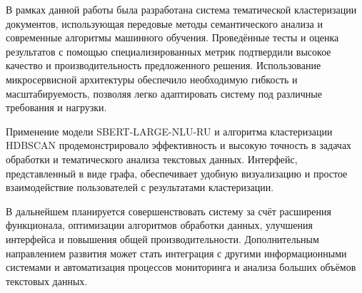 \conclusion

 В рамках данной работы была разработана система тематической кластеризации документов, использующая передовые методы семантического анализа и современные алгоритмы машинного обучения. Проведённые тесты и оценка результатов с помощью специализированных метрик подтвердили высокое качество и производительность предложенного решения. Использование микросервисной архитектуры обеспечило необходимую гибкость и масштабируемость, позволяя легко адаптировать систему под различные требования и нагрузки.

Применение модели SBERT-LARGE-NLU-RU и алгоритма кластеризации HDBSCAN продемонстрировало эффективность и высокую точность в задачах обработки и тематического анализа текстовых данных. Интерфейс, представленный в виде графа, обеспечивает удобную визуализацию и простое взаимодействие пользователей с результатами кластеризации.

В дальнейшем планируется совершенствовать систему за счёт расширения функционала, оптимизации алгоритмов обработки данных, улучшения интерфейса и повышения общей производительности. Дополнительным направлением развития может стать интеграция с другими информационными системами и автоматизация процессов мониторинга и анализа больших объёмов текстовых данных.